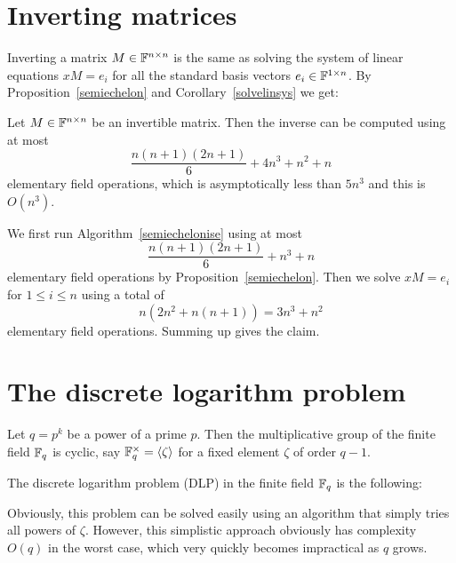 \section{Inverting matrices}
\label{sec:invert}

Inverting a matrix $M \in \mathbb{F}^{n \times n}$ is the same as solving the
system of linear equations $xM = e_i$ for all the standard basis
vectors $e_i \in \mathbb{F}^{1 \times n}$. By Proposition~\ref{semiechelon}
and Corollary~\ref{solvelinsys} we get:

\begin{Prop}
Let $M \in \mathbb{F}^{n \times n}$ be an invertible matrix. Then the inverse
can be computed using at most
\[ \frac{n(n+1)(2n+1)}{6} + 4n^3 + n^2 + n \]
elementary field operations, which is asymptotically less than $5n^3$
and this is $O(n^3)$.
\end{Prop}
\proofbeg
We first run Algorithm~\ref{semiechelonise} using at most
\[ \frac{n(n+1)(2n+1)}{6} + n^3 + n \]
elementary field operations by Proposition~\ref{semiechelon}. Then
we solve $xM = e_i$ for $1 \le i \le n$ using a total of
\[ n(2n^2+n(n+1)) = 3n^3+n^2 \]
elementary field operations. Summing up gives the claim.
\proofend

\section{The discrete logarithm problem}
\label{thedlp}

\begin{Problem}
    Let $q = p^k$ be a power of a prime $p$. Then the multiplicative
    group of the finite field $\mathbb{F}_q$ is cyclic, say $\mathbb{F}_q^\times =
    \left< \zeta \right>$ for a fixed element $\zeta$ of order $q-1$.

    The discrete logarithm problem (DLP) in the finite field $\mathbb{F}_q$ is
    the following:

    \begin{center}
\end{center}
\end{Problem}

\medskip
Obviously, this problem can be solved easily using an algorithm that
simply tries all powers of $\zeta$. However, this simplistic approach
obviously has complexity $O(q)$ in the worst case, which very quickly
becomes impractical as $q$ grows.

